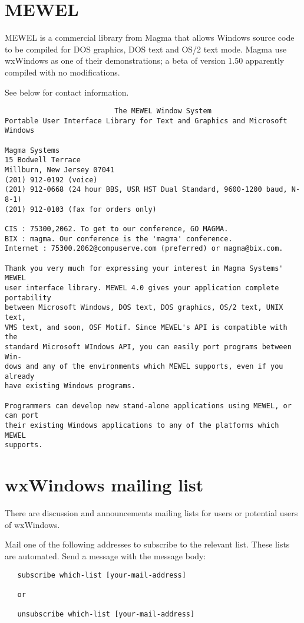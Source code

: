 \section{MEWEL}

MEWEL is a commercial library from Magma that allows Windows source code
to be compiled for DOS graphics, DOS text and OS/2 text mode. Magma use
wxWindows as one of their demonstrations; a beta of version 1.50
apparently compiled with no modifications.

See below for contact information.

\begin{verbatim}
                          The MEWEL Window System
Portable User Interface Library for Text and Graphics and Microsoft Windows

Magma Systems
15 Bodwell Terrace
Millburn, New Jersey 07041
(201) 912-0192 (voice)
(201) 912-0668 (24 hour BBS, USR HST Dual Standard, 9600-1200 baud, N-8-1)
(201) 912-0103 (fax for orders only)

CIS : 75300,2062. To get to our conference, GO MAGMA.
BIX : magma. Our conference is the 'magma' conference.
Internet : 75300.2062@compuserve.com (preferred) or magma@bix.com.

Thank you very much for expressing your interest in Magma Systems' MEWEL
user interface library. MEWEL 4.0 gives your application complete portability
between Microsoft Windows, DOS text, DOS graphics, OS/2 text, UNIX text,
VMS text, and soon, OSF Motif. Since MEWEL's API is compatible with the
standard Microsoft WIndows API, you can easily port programs between Win-
dows and any of the environments which MEWEL supports, even if you already
have existing Windows programs.

Programmers can develop new stand-alone applications using MEWEL, or can port
their existing Windows applications to any of the platforms which MEWEL
supports.
\end{verbatim}

\section{wxWindows mailing list}

There are discussion and announcements mailing lists for users or
potential users of wxWindows.
   
Mail one of the following addresses to subscribe to the relevant list.
These lists are automated. Send a message with the message body:

\begin{verbatim}
   subscribe which-list [your-mail-address]

   or

   unsubscribe which-list [your-mail-address]
\end{verbatim}

